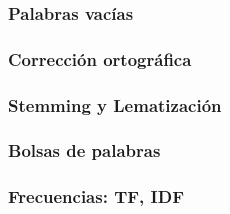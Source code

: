 \subsubsection{Palabras vacías}

\subsubsection{Corrección ortográfica}

\subsubsection{Stemming y Lematización}

\subsubsection{Bolsas de palabras}

\subsubsection{Frecuencias: TF, IDF}






